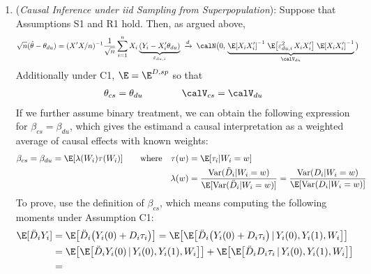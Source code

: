 \documentclass[12pt]{article}
\theoremstyle{plain}
\theoremstyle{definition}
\theoremstyle{remark}
\newcommand{\Var}{\operatorname{Var}}
\newcommand{\dto}{\xrightarrow{d}}
\newcommand{\sumin}{\sum^n_{i=1}}
\begin{document}
\begin{enumerate}
  \item
    (\emph{Causal Inference under iid Sampling from Superpopulation}):
    Suppose that Assumptions S1 and R1 hold.
    Then, as argued above,
    \begin{align*}
      \sqrt{n}(\hat{\theta}-\theta_{du})
      =
      (X'X/n)^{-1}
      \frac{1}{\sqrt{n}}
      \sumin
      X_i
      \underbrace{%
        (Y_i-X_i'\theta_{du})
      }_{\varepsilon_{du,i}}
      &
      \; \dto\;
      \calN\big(
        0,\,
        \underbrace{%
        \E[X_iX_i']^{-1}
        \;
        \E\big[\varepsilon^2_{du,i}\,X_iX_i'\big]
        \;
        \E[X_iX_i']^{-1}
        }_{\calV_{du}}
      \big)
    \end{align*}
    Additionally under C1, $\E=\E^{D,sp}$ so that
    \begin{align*}
      \theta_{cs}=\theta_{du}
      \qquad
      \qquad
      \calV_{cs}=\calV_{du}
    \end{align*}
    If we further assume binary treatment, we can obtain the
    following expression for $\beta_{cs}=\beta_{du}$, which gives the
    estimand a causal interpretation as a weighted average of causal
    effects with known weights:
    \begin{align*}
      \beta_{cs}
      =
      \beta_{du}
      =
      \E[\lambda(W_i)\tau(W_i)]
      \qquad\text{where}\quad
      \tau(w)
      &=
      \E[\tau_i|W_i=w]
      \\
      \lambda(w)
      &=
      \frac{%
        \Var(\ddot{D}_i|W_i=w)
      }{%
        \E[\Var(\ddot{D}_i|W_i=w)]
      }
      =
      \frac{%
        \Var({D}_i|W_i=w)
      }{%
        \E[\Var({D}_i|W_i=w)]
      }
    \end{align*}
    To prove, use the definition of $\beta_{cs}$, which means computing
    the following moments under Assumption C1:
    \begin{align*}
      \E[\ddot{D}_iY_i]
      &=
      \E\big[
        \ddot{D}_i
        \big(Y_i(0)+D_i\tau_i\big)
      \big]
      =
      \E\big[
        \E
        \big[
        \ddot{D}_i
        \big(Y_i(0)+D_i\tau_i\big)
        \,|\,
        Y_i(0),Y_i(1),W_i
        \big]
      \big]
      \\
      &=
      \E\big[
        \E
        \big[
        \ddot{D}_iY_i(0)
        \,|\,
        Y_i(0),Y_i(1),W_i
        \big]
      \big]
      +
      \E\big[
        \E
        \big[
        \ddot{D}_iD_i\tau_i
        \,|\,
        Y_i(0),Y_i(1),W_i
        \big]
      \big]
      \\
      &=

\end{align*}
\end{enumerate}
\end{document}
